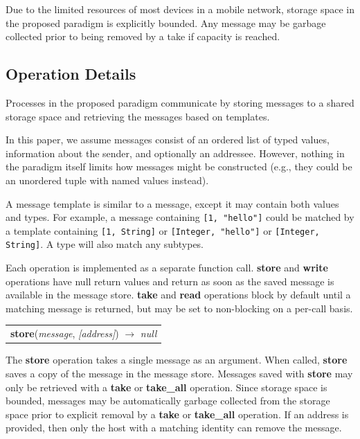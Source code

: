 \documentclass[lnicst]{svmultln}
\begin{document}
Due to the limited resources of most devices in a mobile network, storage space in the proposed paradigm is explicitly bounded. Any message may be garbage collected prior to being removed by a take if capacity is reached.

\subsection{Operation Details}

    Processes in the proposed paradigm communicate by storing messages to a shared storage space and retrieving the messages based on templates.

In this paper, we assume messages consist of an ordered list of typed values, information about the sender, and optionally an addressee. However, nothing in the paradigm itself limits how messages might be constructed (e.g., they could be an unordered tuple with named values instead).

A message template is similar to a message, except it may contain both values and types. For example, a message containing \texttt{[1, "hello"]} could be matched by a template containing \texttt{[1, String]} or \texttt{[Integer, "hello"]} or \texttt{[Integer, String]}. A type will also match any subtypes.

Each operation is implemented as a separate function call. \textbf{store} and \textbf{write} operations have null return values and return as soon as the saved message is available in the message store. \textbf{take} and \textbf{read} operations block by default until a matching message is returned, but may be set to non-blocking on a per-call basis.

\begin{table}
\begin{tabular}{c}
\textbf{store}(\textit{message}, \textit{[address]}) $\rightarrow$ \textit{null}
\end{tabular}
\end{table}

The \textbf{store} operation takes a single message as an argument. When called, \textbf{store} saves a copy of the message in the message store. Messages saved with \textbf{store} may only be retrieved with a \textbf{take} or \textbf{take\_all} operation. Since storage space is bounded, messages may be automatically garbage collected from the storage space prior to explicit removal by a \textbf{take} or \textbf{take\_all} operation. If an address is provided, then only the host with a matching identity can remove the message.
\end{document}

